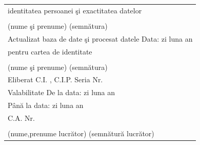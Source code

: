 \documentclass[11pt,a4paper]{article}
\newcommand{\fillline}[1][6cm]{\underline{\hspace{#1}}}
\newcommand{\fillbox}[1][0.4cm]{\framebox[#1]{\rule{0pt}{#1}}}
\begin{document}
\begin{tabularx}{\textwidth}{|m{3cm}|X|}
\multicolumn{2}{|l|}{identitatea persoanei şi exactitatea datelor} \\
\multicolumn{2}{|l|}{\fillline[6cm] \hfill \fillline[5cm]} \\
\multicolumn{2}{|l|}{\footnotesize (nume şi prenume) \hfill (semnătura)} \\
\hline
\multicolumn{2}{|l|}{Actualizat baza de date şi procesat datele \hfill Data: \hspace{0.3cm} zi \fillbox\fillbox \hspace{0.3cm} luna \fillbox\fillbox \hspace{0.3cm} an \fillbox\fillbox\fillbox\fillbox} \\
\multicolumn{2}{|l|}{pentru cartea de identitate} \\
\multicolumn{2}{|l|}{\fillline[6cm] \hfill \fillline[5cm]} \\
\multicolumn{2}{|l|}{\footnotesize (nume şi prenume) \hfill (semnătura)} \\
\hline
\multicolumn{2}{|l|}{Eliberat \hspace{0.3cm} C.I. , C.I.P. \hspace{0.5cm} Seria \fillbox\fillbox \hspace{0.3cm} Nr. \fillbox\fillbox\fillbox\fillbox\fillbox\fillbox} \\
\multicolumn{2}{|l|}{\hspace{1.5cm} Valabilitate \hspace{0.3cm} De la data: \hspace{0.3cm} zi \fillbox\fillbox \hspace{0.3cm} luna \fillbox\fillbox \hspace{0.3cm} an \fillbox\fillbox\fillbox\fillbox} \\
\multicolumn{2}{|l|}{\hspace{1.5cm} \phantom{Valabilitate} \hspace{0.3cm} Până la data: \hspace{0.3cm} zi \fillbox\fillbox \hspace{0.3cm} luna \fillbox\fillbox \hspace{0.3cm} an \fillbox\fillbox\fillbox\fillbox} \\
\multicolumn{2}{|l|}{\hspace{1.5cm} C.A. \hspace{0.5cm} Nr. \fillbox\fillbox\fillbox\fillbox\fillbox\fillbox\fillbox} \\
\multicolumn{2}{|l|}{\fillline[6cm] \hfill \fillline[6cm]} \\
\multicolumn{2}{|l|}{\footnotesize (nume,prenume lucrător) \hfill (semnătură lucrător)} \\

\end{tabularx}
\end{document}
